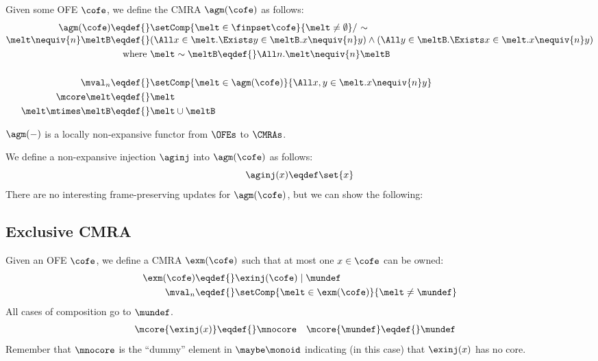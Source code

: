 Given some OFE $\cofe$, we define the CMRA $\agm(\cofe)$ as follows:
\begin{align*}
  \agm(\cofe) \eqdef{}& \setComp{\melt \in \finpset\cofe}{\melt \neq \emptyset} /\ {\sim} \\[-0.2em]
  \melt \nequiv{n} \meltB \eqdef{}& (\All x \in \melt. \Exists y \in \meltB. x \nequiv{n} y) \land (\All y \in \meltB. \Exists x \in \melt. x \nequiv{n} y) \\
  \textnormal{where }& \melt \sim \meltB \eqdef{} \All n. \melt \nequiv{n} \meltB  \\
~\\
  \mval_n \eqdef{}& \setComp{\melt \in \agm(\cofe)}{ \All x, y \in \melt. x \nequiv{n} y } \\
  \mcore\melt \eqdef{}& \melt \\
  \melt \mtimes \meltB \eqdef{}& \melt \cup \meltB
\end{align*}

$\agm(-)$ is a locally non-expansive functor from $\OFEs$ to $\CMRAs$.

We define a non-expansive injection $\aginj$ into $\agm(\cofe)$ as follows:
\[ \aginj(x) \eqdef \set{x} \]
There are no interesting frame-preserving updates for $\agm(\cofe)$, but we can show the following:
\begin{mathpar}

  
\end{mathpar}


\subsection{Exclusive CMRA}

Given an OFE $\cofe$, we define a CMRA $\exm(\cofe)$ such that at most one $x \in \cofe$ can be owned:
\begin{align*}
  \exm(\cofe) \eqdef{}& \exinj(\cofe) \mid \mundef \\
  \mval_n \eqdef{}& \setComp{\melt\in\exm(\cofe)}{\melt \neq \mundef}
\end{align*}
All cases of composition go to $\mundef$.
\begin{align*}
  \mcore{\exinj(x)} \eqdef{}& \mnocore &
  \mcore{\mundef} \eqdef{}& \mundef
\end{align*}
Remember that $\mnocore$ is the ``dummy'' element in $\maybe\monoid$ indicating (in this case) that $\exinj(x)$ has no core.

